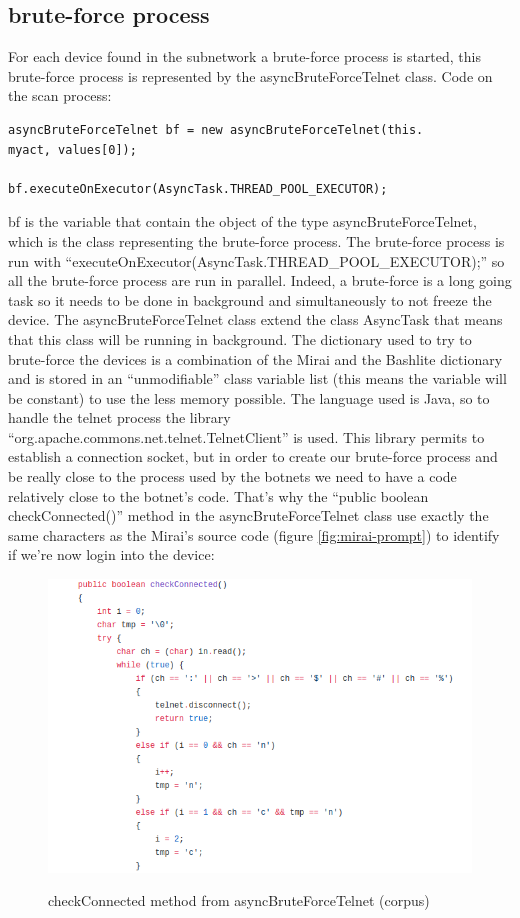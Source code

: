 \documentclass{report}
\begin{document}
\subsection{brute-force process}
For each device found in the subnetwork a brute-force process is started, this brute-force process is represented by the asyncBruteForceTelnet class.\newline
Code on the scan process:
\lstset{language=Java}
\begin{lstlisting}[frame=single]
asyncBruteForceTelnet bf = new asyncBruteForceTelnet(this.
myact, values[0]);

bf.executeOnExecutor(AsyncTask.THREAD_POOL_EXECUTOR);
\end{lstlisting}
bf is the variable that contain the object of the type asyncBruteForceTelnet, which is the class representing the brute-force process. The brute-force process is run with ``executeOnExecutor(AsyncTask.THREAD\_POOL\_EXECUTOR);'' so all the brute-force process are run in parallel. Indeed, a brute-force is a long going task so it needs to be done in background and simultaneously to not freeze the device.\newline
The asyncBruteForceTelnet class extend the class AsyncTask that means that this class will be running in background. The dictionary used to try to brute-force the devices is a combination of the Mirai and the Bashlite dictionary and is stored in an ``unmodifiable'' class variable list (this means the variable will be constant) to use the less memory possible.\newline
The language used is Java, so to handle the telnet process the library \newline``org.apache.commons.net.telnet.TelnetClient'' is used. This library permits to establish a connection socket, but in order to create our brute-force process and be really close to the process used by the botnets we need to have a code relatively close to the botnet's code. That's why the ``public boolean checkConnected()'' method in the asyncBruteForceTelnet class use exactly the same characters as the Mirai's source code (figure \ref{fig:mirai-prompt}) to identify if we're now login into the device:
\begin{figure}[h]
 \caption{checkConnected method from asyncBruteForceTelnet (corpus)}
 \centering
 \includegraphics[width=1\textwidth]{./img/checkconnected-apk}
 \label{fig:checkconnected}
\end{figure}
\end{document}
